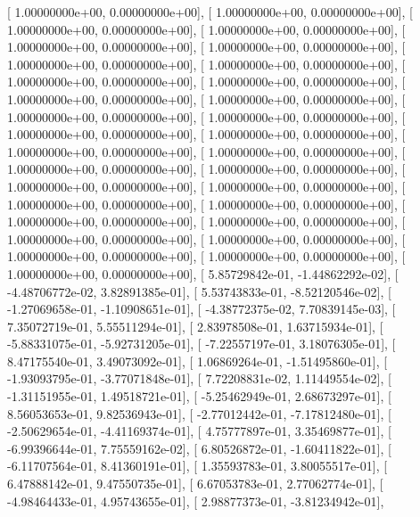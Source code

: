 \documentclass{article}
\begin{document}
       [  1.00000000e+00,   0.00000000e+00],
       [  1.00000000e+00,   0.00000000e+00],
       [  1.00000000e+00,   0.00000000e+00],
       [  1.00000000e+00,   0.00000000e+00],
       [  1.00000000e+00,   0.00000000e+00],
       [  1.00000000e+00,   0.00000000e+00],
       [  1.00000000e+00,   0.00000000e+00],
       [  1.00000000e+00,   0.00000000e+00],
       [  1.00000000e+00,   0.00000000e+00],
       [  1.00000000e+00,   0.00000000e+00],
       [  1.00000000e+00,   0.00000000e+00],
       [  1.00000000e+00,   0.00000000e+00],
       [  1.00000000e+00,   0.00000000e+00],
       [  1.00000000e+00,   0.00000000e+00],
       [  1.00000000e+00,   0.00000000e+00],
       [  1.00000000e+00,   0.00000000e+00],
       [  1.00000000e+00,   0.00000000e+00],
       [  1.00000000e+00,   0.00000000e+00],
       [  1.00000000e+00,   0.00000000e+00],
       [  1.00000000e+00,   0.00000000e+00],
       [  1.00000000e+00,   0.00000000e+00],
       [  1.00000000e+00,   0.00000000e+00],
       [  1.00000000e+00,   0.00000000e+00],
       [  1.00000000e+00,   0.00000000e+00],
       [  1.00000000e+00,   0.00000000e+00],
       [  1.00000000e+00,   0.00000000e+00],
       [  1.00000000e+00,   0.00000000e+00],
       [  1.00000000e+00,   0.00000000e+00],
       [  1.00000000e+00,   0.00000000e+00],
       [  1.00000000e+00,   0.00000000e+00],
       [  1.00000000e+00,   0.00000000e+00],
       [  5.85729842e-01,  -1.44862292e-02],
       [ -4.48706772e-02,   3.82891385e-01],
       [  5.53743833e-01,  -8.52120546e-02],
       [ -1.27069658e-01,  -1.10908651e-01],
       [ -4.38772375e-02,   7.70839145e-03],
       [  7.35072719e-01,   5.55511294e-01],
       [  2.83978508e-01,   1.63715934e-01],
       [ -5.88331075e-01,  -5.92731205e-01],
       [ -7.22557197e-01,   3.18076305e-01],
       [  8.47175540e-01,   3.49073092e-01],
       [  1.06869264e-01,  -1.51495860e-01],
       [ -1.93093795e-01,  -3.77071848e-01],
       [  7.72208831e-02,   1.11449554e-02],
       [ -1.31151955e-01,   1.49518721e-01],
       [ -5.25462949e-01,   2.68673297e-01],
       [  8.56053653e-01,   9.82536943e-01],
       [ -2.77012442e-01,  -7.17812480e-01],
       [ -2.50629654e-01,  -4.41169374e-01],
       [  4.75777897e-01,   3.35469877e-01],
       [ -6.99396644e-01,   7.75559162e-02],
       [  6.80526872e-01,  -1.60411822e-01],
       [ -6.11707564e-01,   8.41360191e-01],
       [  1.35593783e-01,   3.80055517e-01],
       [  6.47888142e-01,   9.47550735e-01],
       [  6.67053783e-01,   2.77062774e-01],
       [ -4.98464433e-01,   4.95743655e-01],
       [  2.98877373e-01,  -3.81234942e-01],
\end{document}
